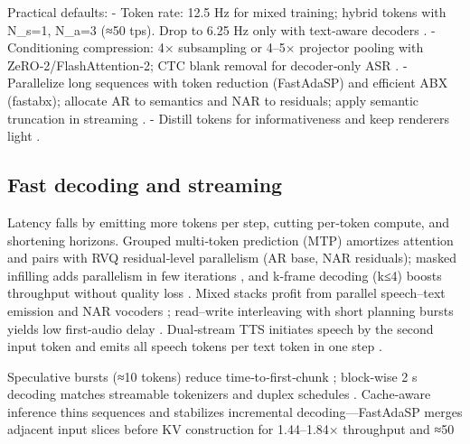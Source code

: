 \documentclass{article}
\begin{document}
Practical defaults:
- Token rate: 12.5 Hz for mixed training; hybrid tokens with N_s=1, N_a=3 (≈50 tps). Drop to 6.25 Hz only with text‑aware decoders \cite{yang2025diffsoundstreamefficientspeechtokenizati,wang2025tadicodectextawarediffusionspeechtokeniz}.
- Conditioning compression: 4× subsampling or 4–5× projector pooling with ZeRO‑2/FlashAttention‑2; CTC blank removal for decoder‑only ASR \cite{wang2023slmbridgethingapbetweenspeechtextfoundat,nguyen2025qwenvsgemmaintegrationwhispercomparative,tsunoo2024decoderonlyarchitecturespeechrecognition}.
- Parallelize long sequences with token reduction (FastAdaSP) and efficient ABX (fastabx); allocate AR to semantics and NAR to residuals; apply semantic truncation in streaming \cite{lu2024fastadaspmultitaskadaptedefficientinfere,poli2025fastabxlibraryefficientcomputationabxdis}.
- Distill tokens for informativeness and keep renderers light \cite{ahasan2025dmcodecdistillingmultimodalrepresentatio,wang2025tadicodectextawarediffusionspeechtokeniz}.

\subsection{Fast decoding and streaming} \label{subsec:Fast decoding and streaming}
Latency falls by emitting more tokens per step, cutting per‑token compute, and shortening horizons. Grouped multi‑token prediction (MTP) amortizes attention and pairs with RVQ residual‑level parallelism (AR base, NAR residuals); masked infilling adds parallelism in few iterations \cite{li2024masksrmaskedlanguagemodelfullbandspeechr}, and k‑frame decoding (k≤4) boosts throughput without quality loss \cite{bai2025dmelspeechtokenizationmadesimple}. Mixed stacks profit from parallel speech–text emission and NAR vocoders \cite{tan2025drvoiceparallelspeechtextvoiceconversati}; read–write interleaving with short planning bursts yields low first‑audio delay \cite{fang2025llamaomni2llmbasedrealtimespokenchatbota}. Dual‑stream TTS initiates speech by the second input token and emits all speech tokens per text token in one step \cite{sheng2025syncspeechlowlatencyefficientdualstreamt}.

Speculative bursts (≈10 tokens) reduce time‑to‑first‑chunk \cite{long2025vitaaudiofastinterleavedcrossmodaltokeng}; block‑wise 2 s decoding matches streamable tokenizers and duplex schedules \cite{zeng2024scalingspeechtextpretrainingsyntheticint}. Cache‑aware inference thins sequences and stabilizes incremental decoding—FastAdaSP merges adjacent input slices before KV construction for 1.44–1.84× throughput and ≈50%
\end{document}
